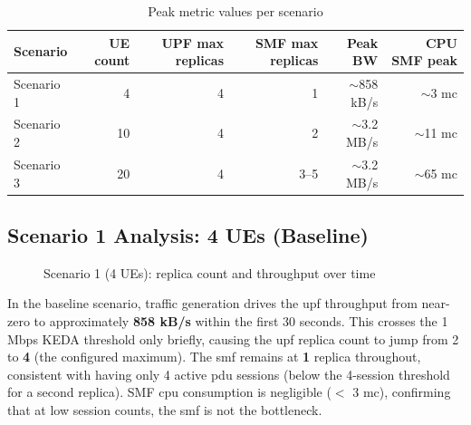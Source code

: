 \begin{table}[H]
  \centering
  \caption{Peak metric values per scenario}
  \label{tab:results_summary}
  \begin{tabularx}{\linewidth}{lrrrrr}
    \toprule
    \textbf{Scenario} & \textbf{UE count} & \textbf{UPF max replicas} & \textbf{SMF max replicas} & \textbf{Peak BW} & \textbf{CPU SMF peak} \\
    \midrule
    Scenario 1 & 4  & 4 & 1 & $\sim$858 kB/s & $\sim$3 mc \\
    Scenario 2 & 10 & 4 & 2 & $\sim$3.2 MB/s & $\sim$11 mc \\
    Scenario 3 & 20 & 4 & 3--5 & $\sim$3.2 MB/s & $\sim$65 mc \\
    \bottomrule
  \end{tabularx}
\end{table}

\subsection{Scenario 1 Analysis: 4 UEs (Baseline)}

\begin{figure}[H]
  \centering
  \caption{Scenario 1 (4 UEs): replica count and throughput over time}
  \label{fig:scenario_4ues}
\end{figure}

In the baseline scenario, traffic generation drives the \gls{upf} throughput from near-zero to approximately \textbf{858 kB/s} within the first 30 seconds. This crosses the 1 Mbps KEDA threshold only briefly, causing the \gls{upf} replica count to jump from 2 to \textbf{4} (the configured maximum). The \gls{smf} remains at \textbf{1} replica throughout, consistent with having only 4 active \gls{pdu} sessions (below the 4-session threshold for a second replica). SMF \gls{cpu} consumption is negligible ($<$ 3 mc), confirming that at low session counts, the \gls{smf} is not the bottleneck.

